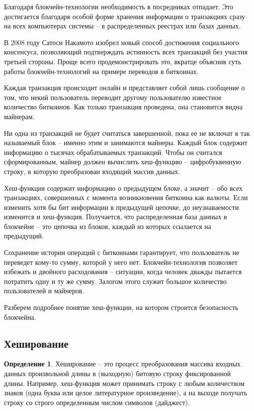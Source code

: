 \documentclass[och, master, nir]{SCWorks_fix}
\theoremstyle{plain}
\theoremstyle{plain}
\theoremstyle{plain}
\theoremstyle{definition}
\newtheorem{defn}{Определение}
\begin{document}
Благодаря блокчейн-технологии необходимость в посредниках отпадает. Это достигается благодаря особой форме хранения информации о транзакциях сразу на всех компьютерах системы – в распределенных реестрах или базах данных.

В 2008 году Сатоси Накамото изобрел новый способ достижения социального консенсуса, позволяющий подтверждать истинность всех транзакций без участия третьей стороны. Проще всего продемонстрировать это, вкратце объяснив суть работы блокчейн-технологий на примере переводов в биткоинах.

Каждая транзакция происходит онлайн и представляет собой лишь сообщение о том, что некий пользователь переводит другому пользователю известное количество биткоинов. Как только транзакция проведена, она становится видна майнерам.

Ни одна из транзакций не будет считаться завершенной, пока ее не включат в так называемый блок – именно этим и занимаются майнеры. Каждый блок содержит информацию о тысячах обрабатываемых транзакций. Чтобы он считался сформированным, майнер должен вычислить хеш-функцию – цифробуквенную строку, в которую преобразован входящий массив данных.

Хеш-функция содержит информацию о предыдущем блоке, а значит – обо всех транзакциях, совершенных с момента возникновения биткоина как валюты. Если изменить хотя бы бит информации в предыдущей цепочке, до неузнаваемости изменится и хеш-функция. Получается, что распределенная база данных в блокчейне – это цепочка из блоков, каждый из которых ссылается на предыдущий.

Сохранение истории операций с биткоинами гарантирует, что пользователь не переведет кому-то сумму, которой у него нет. Блокчейн-технология позволяет избежать и двойного расходования – ситуации, когда человек дважды пытается потратить одну и ту же сумму. Залогом этого служит большое количество пользователей и майнеров.

Разберем подробнее понятие хеш-функции, на котором строится безопасность блокчейна.

\subsection{Хеширование}
\begin{defn}
Хеширование – это процесс преобразования массива входных данных произвольной длины в (выходную) битовую строку фиксированной длины. Например, хеш-функция может принимать строку с любым количеством знаков (одна буква или целое литературное произведение), а на выходе получать строку со строго определенным числом символов (дайджест).
\end{defn}
\end{document}
